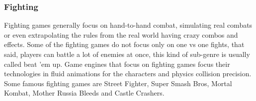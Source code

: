 \subsubsection{Fighting}
Fighting games generally focus on hand-to-hand combat, simulating real combats or even extrapolating the rules from the real world having crazy combos and effects. Some of the fighting games do not focus only on one vs one fights, that said, players can battle a lot of enemies at once, this kind of sub-genre is usually called beat 'em up\cite{FundamentalsOfGameDesign}. Game engines that focus on fighting games focus their technologies in fluid animations for the characters and physics collision precision\cite{GameEngineArchitecture}. Some famous fighting games are Street Fighter, Super Smash Bros, Mortal Kombat, Mother Russia Bleeds and Castle Crashers\cite{FightingGames,BeetEmUpGames}.
